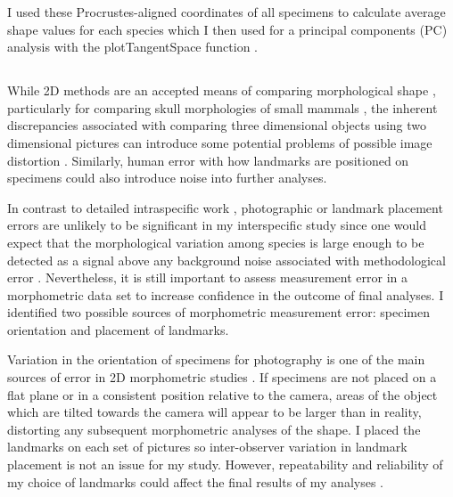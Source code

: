	I used these Procrustes-aligned coordinates of all specimens to calculate average shape values for each species which I then used for a principal components (PC) analysis with the plotTangentSpace function \citep{Adams2013}. 
	

\subsection{}
	 
	While 2D methods are an accepted means of comparing morphological shape \citep[e.g.][]{Adams2004, Mitteroecker2009}, particularly for comparing skull morphologies of small mammals \citep[e.g.][]{Cardini2003, Panchetti2008, White2008, Barrow2008, Scalici2011}, the inherent discrepancies associated with comparing three dimensional objects using two dimensional pictures can introduce some potential problems of possible image distortion \citep{Arnqvist1998}. Similarly, human error with how landmarks are positioned on specimens could also introduce noise into further analyses. 
	
	In contrast to detailed intraspecific work \citep[e.g.][]{Bornholdt2008, Blagojevic2011}, photographic or landmark placement errors are unlikely to be significant in my interspecific study since one would expect that the morphological variation among species is large enough to  be detected as a signal above any background noise associated with methodological error \citep{Arnqvist1998}. Nevertheless, it is still important to assess measurement error in a morphometric data set to increase confidence in the outcome of final analyses.
	I identified two possible sources of morphometric measurement error: specimen orientation and placement of landmarks.

	Variation in the orientation of specimens for photography is one of the main sources of error in 2D morphometric studies \citep{Adriaens2007}. If specimens are not placed on a flat plane or in a consistent position relative to the camera, areas of the object which are tilted towards the camera will appear to be larger than in reality, distorting any subsequent morphometric analyses of the shape. 
	I placed the landmarks on each set of pictures so inter-observer variation in landmark placement is not an issue for my study.  However, repeatability and reliability of my choice of landmarks could affect the final results of my analyses \citep{Arnqvist1998}.


